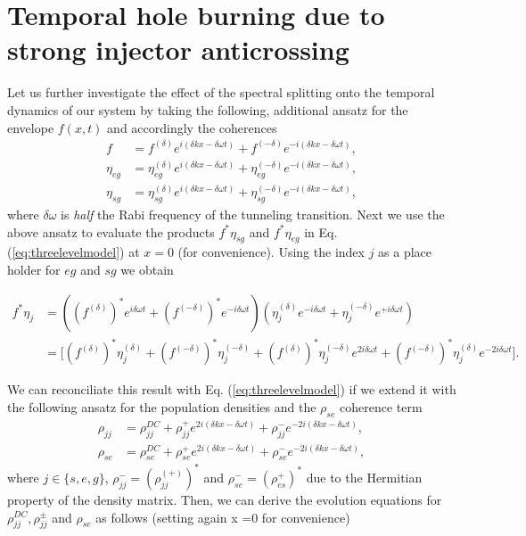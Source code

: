 \documentclass[twocolumn,secnumarabic,amssymb, nobibnotes, aps, prd]{revtex4-1}
\begin{document}
\section{Temporal hole burning due to strong injector anticrossing}
Let us further investigate the effect of the spectral splitting onto the temporal dynamics of our system by taking the following, additional ansatz for the envelope $f(x,t)$ and accordingly the coherences
\begin{subequations}
	\begin{align}
	\label{eq:splittingAnsatz}
	f &= f^{(\delta)}e^{i(\delta k x  - \delta\omega t)} + f^{(-\delta)}e^{-i(\delta kx-\delta\omega t)}, \\
	\eta_{eg} &= \eta_{eg}^{(\delta)}e^{i(\delta k x  - \delta\omega t)} + \eta_{eg}^{(-\delta)}e^{-i(\delta kx-\delta\omega t)}, \\
	\eta_{sg} &= \eta_{sg}^{(\delta)}e^{i(\delta k x  - \delta\omega t)} + \eta_{sg}^{(-\delta)}e^{-i(\delta kx-\delta\omega t)},
	\end{align}
\end{subequations}
where $\delta\omega$ is \emph{half} the Rabi frequency of the tunneling transition. Next we use the above ansatz to evaluate the products $f^*\eta_{sg}$ and $f^*\eta_{eg}$ in Eq. (\ref{eq:threelevelmodel}) at $x=0$ (for convenience). Using the index $j$ as a place holder for $eg$ and  $sg$ we obtain
\begin{widetext}
	\begin{align}
	\label{eq:feta-product}
	f^{*}\eta_{j} &= ((f^{(\delta)})^*e^{  i\delta\omega t} + (f^{(-\delta)})^*e^{-i\delta\omega t})(\eta_{j}^{(\delta)}e^{ - i\delta\omega t} + \eta_{j}^{(-\delta)}e^{+i\delta\omega t}) \nonumber \\
	&= \big[ (f^{(\delta)})^*\eta_{j}^{(\delta)} +(f^{(-\delta)})^*\eta_{j}^{(-\delta)} + (f^{(\delta)})^*\eta_{j}^{(-\delta)}e^{2i\delta\omega t} + (f^{(-\delta)})^*\eta_{j}^{(\delta)}e^{-2i\delta\omega t}\big ].
	\end{align} 
\end{widetext}
We can reconciliate this result with Eq. (\ref{eq:threelevelmodel}) if we extend it with the following ansatz for the  population densities and the $\rho_{se}$ coherence term 
\begin{align}
\rho_{jj} &= \rho_{jj}^{DC}+\rho_{jj}^{+}e^{2i(\delta k x-\delta \omega t)} + \rho_{jj}^{-}e^{-2i(\delta k x-\delta \omega t)}, \\
\rho_{se} &= \rho_{se}^{DC}+\rho_{se}^{+}e^{2i(\delta k x-\delta \omega t)} + \rho_{se}^{-}e^{-2i(\delta k x-\delta \omega t)},
\end{align}
where $j \in \{s,e,g\}$, $\rho_{jj}^{-} = (\rho_{jj}^{(+)})^*$ and $\rho_{se}^{-} = (\rho_{es}^{+})^*$ due to the Hermitian property of the density matrix. Then, we can derive the evolution equations for $\rho_{jj}^{DC},\rho_{jj}^{\pm}$ and $\rho_{se}$ as follows (setting again x =0 for convenience)
\end{document}
